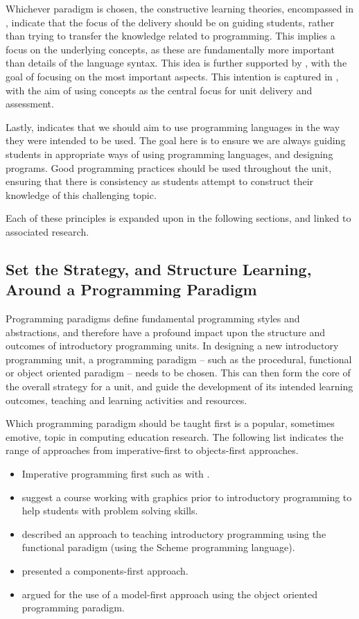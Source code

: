 Whichever paradigm is chosen, the constructive learning theories, encompassed in , indicate that the focus of the delivery should be on guiding students, rather than trying to transfer the knowledge related to programming. This implies a focus on the underlying concepts, as these are fundamentally more important than details of the language syntax. This idea is further supported by , with the goal of focusing on the most important aspects. This intention is captured in , with the aim of using concepts as the central focus for unit delivery and assessment.

Lastly,  indicates that we should aim to use programming languages in the way they were intended to be used. The goal here is to ensure we are always guiding students in appropriate ways of using programming languages, and designing programs. Good programming practices should be used throughout the unit, ensuring that there is consistency as students attempt to construct their knowledge of this challenging topic.

Each of these principles is expanded upon in the following sections, and linked to associated research.


\subsection{Set the Strategy, and Structure Learning, Around a Programming Paradigm} %
\label{ssub:strategy_around_paradigm}

Programming paradigms define fundamental programming styles and abstractions, and therefore have a profound impact upon the structure and outcomes of introductory programming units. In designing a new introductory programming unit, a programming paradigm -- such as the procedural, functional or object oriented paradigm -- needs to be chosen. This can then form the core of the overall strategy for a unit, and guide the development of its intended learning outcomes, teaching and learning activities and resources.

Which programming paradigm should be taught first is a popular, sometimes emotive, topic in computing education research. The following list indicates the range of approaches from imperative-first to objects-first approaches.
\begin{itemize}[noitemsep,nolistsep]
	\item Imperative programming first such as with \citet{Koffman:1988a}.
	\item \citet{Cooper:2003} suggest a course working with graphics prior to introductory programming to help students with problem solving skills.
	\item \citet{Felleisen:2004} described an approach to teaching introductory programming using the functional paradigm (using the Scheme programming language).
	\item \citet{Howe:2004} presented a components-first approach.
	\item \citet{Bennedsen:2004} argued for the use of a model-first approach using the object oriented programming paradigm.
\end{itemize}

